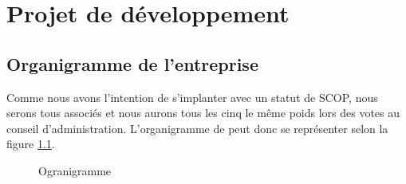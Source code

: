 	\chapter{Projet de développement}
		\section{Organigramme de l'entreprise}
		Comme nous avons l'intention de s'implanter avec un statut de SCOP, nous serons tous associés et nous aurons 
		tous les cinq le même poids lors des votes au conseil d'administration. L'organigramme de \K{} peut donc se
		représenter selon la figure \ref{fig:org}.
		\begin{figure}[h]
		  \begin{center}
			
		  \end{center}
		  \caption{Ogranigramme}
		  \label{fig:org}
		\end{figure}


